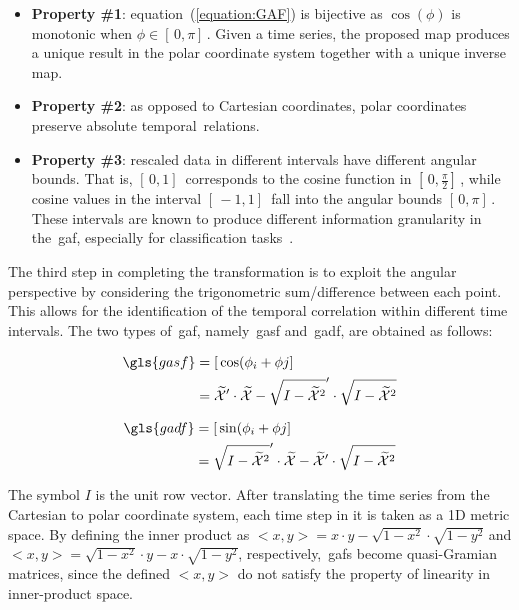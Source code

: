 \begin{itemize}[leftmargin=*,labelsep=5.8mm]
\item \textbf{{Property \#1}}: equation~(\ref{equation:GAF}) is bijective as $\cos(\phi)$ is monotonic when $\phi \in [\,0,\pi]\,$. Given a time series, the proposed map produces a unique result in the polar coordinate system together with a unique inverse map. 
\item \textbf{{Property \#2}}: as opposed to Cartesian coordinates, polar coordinates preserve absolute temporal~relations.
\item \textbf{{Property \#3}}: rescaled data in different intervals have different angular bounds. That is, $[\,0,1]\,$ corresponds to the cosine function in $[\,0,\frac{\pi}{2}]\,$, while cosine values in the interval $[\,-1,1]\,$ fall into the angular bounds $[\,0,\pi]\,$. These intervals are known to produce different information granularity in the~\gls{gaf}, especially for classification tasks~\citep{wang_imaging_2015}.
\end{itemize}

The third step in completing the transformation is to exploit the angular perspective by considering the trigonometric sum/difference between each point. This allows for the identification of the temporal correlation within different time intervals. The two types of~\gls{gaf}, namely~\gls{gasf} and~\gls{gadf}, are obtained as follows:

\begin{equation}
    \begin{aligned}
    \gls{gasf} &= [\,\cos(\phi_{i} + \phi{j}]\, \\
    	 &= \widetilde{\mathcal{X}}' \cdot \widetilde{\mathcal{X}} - \sqrt{I-\widetilde{\mathcal{X}}^2}' \cdot \sqrt{I-\widetilde{\mathcal{X}}^2}
    \end{aligned}
\end{equation}

\begin{equation}
    \begin{aligned}
    \gls{gadf} &= [\,\sin(\phi_{i} + \phi{j}]\, \\
    	 &= \sqrt{I-\widetilde{\mathcal{X}}^2}' \cdot \widetilde{\mathcal{X}} - \widetilde{\mathcal{X}}' \cdot \sqrt{I-\widetilde{\mathcal{X}}^2}\\
    \end{aligned}
\end{equation}

The symbol $I$ is the unit row vector. After translating the time series from the Cartesian to polar coordinate system, each time step in it is taken as a 1D metric space. By defining the inner product as $<x,y> = x \cdot y - \sqrt{1-x^2} \cdot \sqrt{1-y^2}$ and $<x,y> = \sqrt{1-x^2} \cdot y - x \cdot \sqrt{1-y^2}$,
respectively,~\gls{gaf}s become {quasi-Gramian} matrices, since the defined $<x,y>$ do not satisfy the property of linearity in inner-product space.

